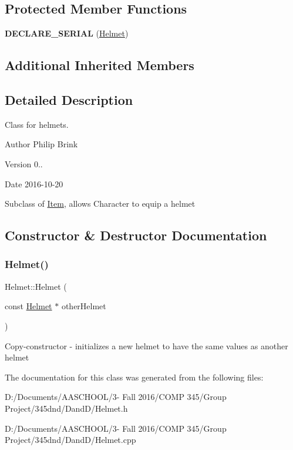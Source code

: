 \subsection*{Protected Member Functions}
\begin{DoxyCompactItemize}
\item 
\hypertarget{class_helmet_a4d6756de7cf75e7cf04548c74d045ae2}{}\label{class_helmet_a4d6756de7cf75e7cf04548c74d045ae2} 
{\bfseries D\+E\+C\+L\+A\+R\+E\+\_\+\+S\+E\+R\+I\+AL} (\hyperlink{class_helmet}{Helmet})
\end{DoxyCompactItemize}
\subsection*{Additional Inherited Members}


\subsection{Detailed Description}
Class for helmets. 

\begin{DoxyAuthor}{Author}
Philip Brink 
\end{DoxyAuthor}
\begin{DoxyVersion}{Version}
0.. 
\end{DoxyVersion}
\begin{DoxyDate}{Date}
2016-\/10-\/20
\end{DoxyDate}
Subclass of \hyperlink{class_item}{Item}, allows Character to equip a helmet 

\subsection{Constructor \& Destructor Documentation}
\hypertarget{class_helmet_a27eceb089c04d2dcab69d49d30d7b92c}{}\label{class_helmet_a27eceb089c04d2dcab69d49d30d7b92c} 
\subsubsection{\texorpdfstring{Helmet()}{Helmet()}}
{\footnotesize\ttfamily Helmet\+::\+Helmet (\begin{DoxyParamCaption}\item[{const \hyperlink{class_helmet}{Helmet} $\ast$}]{other\+Helmet }\end{DoxyParamCaption})}

Copy-\/constructor -\/ initializes a new helmet to have the same values as another helmet 

The documentation for this class was generated from the following files\+:\begin{DoxyCompactItemize}
\item 
D\+:/\+Documents/\+A\+A\+S\+C\+H\+O\+O\+L/3-\/ Fall 2016/\+C\+O\+M\+P 345/\+Group Project/345dnd/\+Dand\+D/Helmet.\+h\item 
D\+:/\+Documents/\+A\+A\+S\+C\+H\+O\+O\+L/3-\/ Fall 2016/\+C\+O\+M\+P 345/\+Group Project/345dnd/\+Dand\+D/Helmet.\+cpp\end{DoxyCompactItemize}
